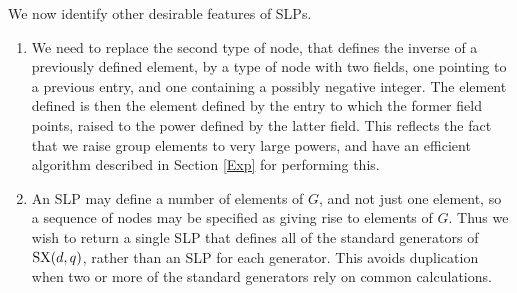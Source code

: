 \documentclass[12pt]{article}
\def\SX{{\rm SX}}
\begin{document}
We now identify other desirable features of SLPs. 
\begin{enumerate}
\item 
We need to replace the second type of node, that defines the 
inverse of a previously defined element, by a type of node with two fields, 
one pointing to a previous entry, and one containing 
a possibly negative integer.  The element defined is then the 
element defined by the entry to which
the former field points, raised to the power defined by 
the latter field.  This reflects the fact that we
raise group elements to very large powers, and have 
an efficient algorithm described in Section \ref{Exp} for performing this.

\item 
An SLP may define a number of elements of $G$,
and not just one element, so a sequence of nodes may be specified as 
giving rise to elements
of $G$.  Thus we wish to return a single SLP that defines 
all of the standard generators of $\SX(d,q)$, rather than an SLP
for each generator.
This avoids duplication when two or more of the standard generators 
rely on common calculations.



\end{enumerate}
\end{document}
